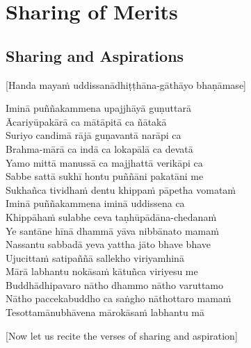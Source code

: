 
\chapter{Sharing of Merits}

\section{Sharing and Aspirations}
\label{sharing-aspirations}

\begin{center}
  [Handa mayaṁ uddissanādhiṭṭhāna-gāthāyo bhaṇāmase]
\end{center}

Iminā puññakammena upajjhāyā guṇuttarā\\
Ācariyūpakārā ca mātāpitā ca ñātakā\\
Suriyo candimā rājā guṇavantā narāpi ca\\
Brahma-mārā ca indā ca lokapālā ca devatā\\
Yamo mittā manussā ca majjhattā verikāpi ca\\
Sabbe sattā sukhī hontu puññāni pakatāni me\\
Sukhañca tividhaṁ dentu khippaṁ pāpetha vomataṁ\\
Iminā puññakammena iminā uddissena ca\\
Khippāhaṁ sulabhe ceva taṇhūpādāna-chedanaṁ\\
Ye santāne hīnā dhammā yāva nibbānato mamaṁ\\
Nassantu sabbadā yeva yattha jāto bhave bhave\\
Ujucittaṁ satipaññā sallekho viriyamhinā\\
Mārā labhantu nokāsaṁ kātuñca viriyesu me\\
Buddhādhipavaro nātho dhammo nātho varuttamo\\
Nātho paccekabuddho ca saṅgho nāthottaro mamaṁ\\
Tesottamānubhāvena mārokāsaṁ labhantu mā


\clearpage

\begin{center}
  [Now let us recite the verses of sharing and aspiration]
\end{center}
\label{uddissanadhitthana} %

